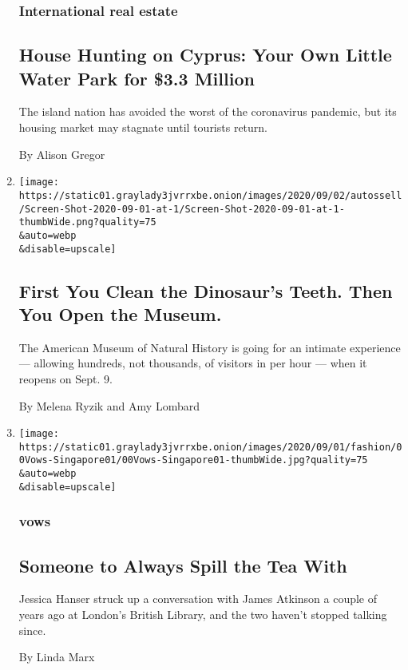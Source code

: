 \begin{enumerate}
  \hypertarget{international-real-estate}{%
  \subsubsection{International real
  estate}\label{international-real-estate}}

  \hypertarget{house-hunting-on-cyprus-your-own-little-water-park-for-33-million}{%
  \subsection{House Hunting on Cyprus: Your Own Little Water Park for
  \$3.3
  Million}\label{house-hunting-on-cyprus-your-own-little-water-park-for-33-million}}

  The island nation has avoided the worst of the coronavirus pandemic,
  but its housing market may stagnate until tourists return.

  By Alison Gregor
\item
  \href{/2020/09/02/arts/design/natural-history-museum-reopening.html}{}

  \texttt{[image: https://static01.graylady3jvrrxbe.onion/images/2020/09/02/autossell/Screen-Shot-2020-09-01-at-1/Screen-Shot-2020-09-01-at-1-thumbWide.png?quality=75\\\&auto=webp\\\&disable=upscale]}

  \hypertarget{first-you-clean-the-dinosaurs-teeth-then-you-open-the-museum}{%
  \subsection{First You Clean the Dinosaur's Teeth. Then You Open the
  Museum.}\label{first-you-clean-the-dinosaurs-teeth-then-you-open-the-museum}}

  The American Museum of Natural History is going for an intimate
  experience --- allowing hundreds, not thousands, of visitors in per
  hour --- when it reopens on Sept. 9.

  By Melena Ryzik and Amy Lombard
\item
  \href{/2020/09/02/fashion/weddings/someone-to-always-spill-the-tea-with.html}{}

  \texttt{[image: https://static01.graylady3jvrrxbe.onion/images/2020/09/01/fashion/00Vows-Singapore01/00Vows-Singapore01-thumbWide.jpg?quality=75\\\&auto=webp\\\&disable=upscale]}

  \hypertarget{vows}{%
  \subsubsection{vows}\label{vows}}

  \hypertarget{someone-to-always-spill-the-tea-with}{%
  \subsection{Someone to Always Spill the Tea
  With}\label{someone-to-always-spill-the-tea-with}}

  Jessica Hanser struck up a conversation with James Atkinson a couple
  of years ago at London's British Library, and the two haven't stopped
  talking since.

  By Linda Marx
\end{enumerate}

